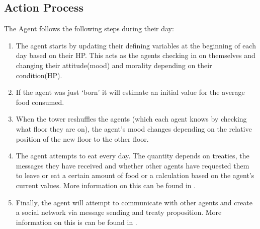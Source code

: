 \subsection{Action Process}
The Agent follows the following steps during their day: 
\begin{enumerate}
    \item The agent starts by updating their defining variables at the beginning of each day based on their HP. This acts as the agents checking in on themselves and changing their attitude(mood) and morality depending on their condition(HP).
    \item If the agent was just ‘born’ it will estimate an initial value for the average food consumed. 
    \item When the tower reshuffles the agents (which each agent knows by checking what floor they are on), the agent’s mood changes depending on the relative position of the new floor to the other floor. 
    \item The agent attempts to eat every day. The quantity depends on treaties, the messages they have received and whether other agents have requested them to leave or eat a certain amount of food or a calculation based on the agent’s current values. More information on this can be found in . 
    \item Finally, the agent will attempt to communicate with other agents and create a social network via message sending and treaty proposition. More information on this is can be found in . 
  \end{enumerate}

